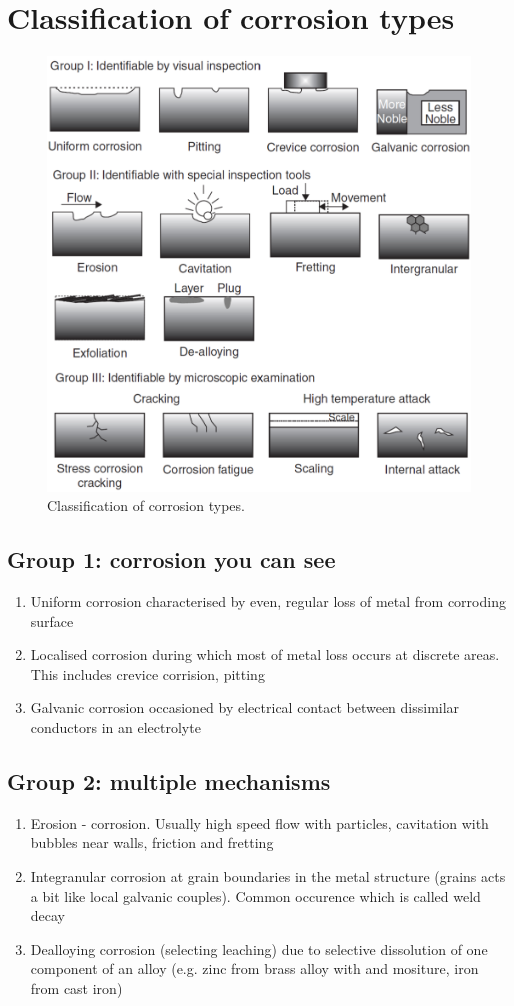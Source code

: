 \section{Classification of corrosion types}
\begin{figure}[H]
    \centering
    \includegraphics[width = \textwidth]{img/figure73.png}
    \caption{Classification of corrosion types.}
\end{figure}
\subsection{Group 1: corrosion you can see}
\begin{enumerate}
    \item Uniform corrosion characterised by even, regular loss of metal from corroding surface
    \item Localised corrosion during which most of metal loss occurs at discrete areas. This includes crevice corrision, pitting
    \item Galvanic corrosion occasioned by electrical contact between dissimilar conductors in an electrolyte
\end{enumerate}
\subsection{Group 2: multiple mechanisms}
\begin{enumerate}
    \item Erosion - corrosion. Usually high speed flow with particles, cavitation with bubbles near walls, friction and fretting
    \item Integranular corrosion at grain boundaries in the metal structure (grains acts a bit like local galvanic couples). Common occurence which is called weld decay
    \item Dealloying corrosion (selecting leaching) due to selective dissolution of one component of an alloy (e.g. zinc from brass alloy with  and mositure, iron from cast iron)
\end{enumerate}
